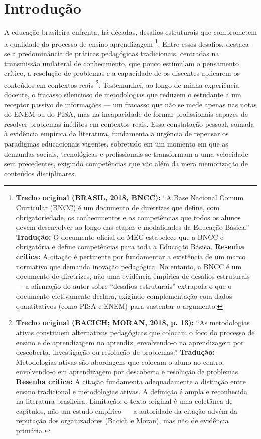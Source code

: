 
\chapter{Introdução}
\label{chap:introducao}

A educação brasileira enfrenta, há décadas, desafios estruturais que comprometem a qualidade do processo de ensino-aprendizagem \cite{BRASIL2018}\footnote{\textbf{Trecho original (BRASIL, 2018, BNCC):} ``A Base Nacional Comum Curricular (BNCC) é um documento de diretrizes que define, com obrigatoriedade, os conhecimentos e as competências que todos os alunos devem desenvolver ao longo das etapas e modalidades da Educação Básica.'' \textbf{Tradução:} O documento oficial do MEC estabelece que a BNCC é obrigatória e define competências para toda a Educação Básica. \textbf{Resenha crítica:} A citação é pertinente por fundamentar a existência de um marco normativo que demanda inovação pedagógica. No entanto, a BNCC é um documento de diretrizes, não uma evidência empírica de desafios estruturais — a afirmação do autor sobre ``desafios estruturais'' extrapola o que o documento efetivamente declara, exigindo complementação com dados quantitativos (como PISA e ENEM) para sustentar o argumento.}. Entre esses desafios, destaca-se a predominância de práticas pedagógicas tradicionais, centradas na transmissão unilateral de conhecimento, que pouco estimulam o pensamento crítico, a resolução de problemas e a capacidade de os discentes aplicarem os conteúdos em contextos reais \cite{BACICH2018}\footnote{\textbf{Trecho original (BACICH; MORAN, 2018, p. 13):} ``As metodologias ativas constituem alternativas pedagógicas que colocam o foco do processo de ensino e de aprendizagem no aprendiz, envolvendo-o na aprendizagem por descoberta, investigação ou resolução de problemas.'' \textbf{Tradução:} Metodologias ativas são abordagens que colocam o aluno no centro, envolvendo-o em aprendizagem por descoberta e resolução de problemas. \textbf{Resenha crítica:} A citação fundamenta adequadamente a distinção entre ensino tradicional e metodologias ativas. A definição é ampla e reconhecida na literatura brasileira. Limitação: o texto original é uma coletânea de capítulos, não um estudo empírico — a autoridade da citação advém da reputação dos organizadores (Bacich e Moran), mas não de evidência primária.}. Testemunhei, ao longo de minha experiência docente, o fracasso silencioso de metodologias que reduzem o estudante a um receptor passivo de informações — um fracasso que não se mede apenas nas notas do ENEM ou do PISA, mas na incapacidade de formar profissionais capazes de resolver problemas inéditos em contextos reais. Essa constatação pessoal, somada à evidência empírica da literatura, fundamenta a urgência de repensar os paradigmas educacionais vigentes, sobretudo em um momento em que as demandas sociais, tecnológicas e profissionais se transformam a uma velocidade sem precedentes, exigindo competências que vão além da mera memorização de conteúdos disciplinares.

